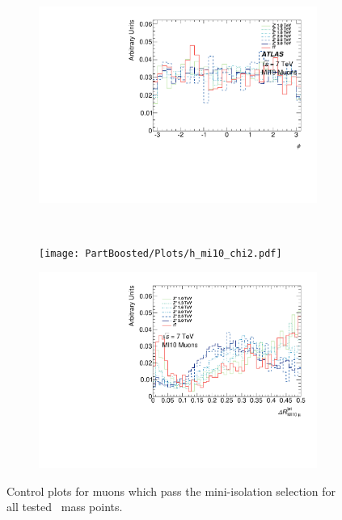 \begin{figure}
\begin{subfigure}{0.49\linewidth}
\includegraphics[width=\textwidth]{PartBoosted/Plots/h_mi10_phi.pdf}
\end{subfigure}
~
\begin{subfigure}{0.49\linewidth}
\texttt{[image: PartBoosted/Plots/h\_mi10\_chi2.pdf]}
\end{subfigure}

\begin{subfigure}{\linewidth}
\includegraphics[width=\textwidth]{PartBoosted/Plots/h_mi10_jet_dr.pdf}
\end{subfigure}

\caption{Control plots for muons which pass the mini-isolation selection for all tested \Zprime\ mass points.} \label{fig:BoostedControlSMT}
\end{figure}

